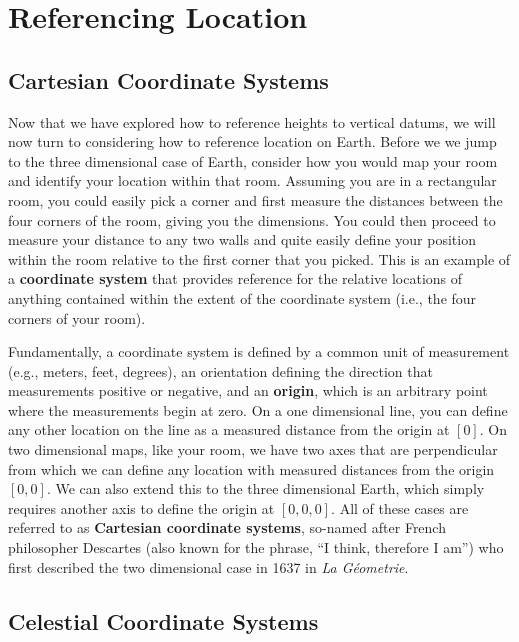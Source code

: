 \documentclass[
]{book}
\begin{document}
\hypertarget{referencing-location}{%
\section{Referencing Location}\label{referencing-location}}

\hypertarget{cartesian-coordinate-systems}{%
\subsection{Cartesian Coordinate Systems}\label{cartesian-coordinate-systems}}

Now that we have explored how to reference heights to vertical datums, we will now turn to considering how to reference location on Earth. Before we we jump to the three dimensional case of Earth, consider how you would map your room and identify your location within that room. Assuming you are in a rectangular room, you could easily pick a corner and first measure the distances between the four corners of the room, giving you the dimensions. You could then proceed to measure your distance to any two walls and quite easily define your position within the room relative to the first corner that you picked. This is an example of a \textbf{coordinate system} that provides reference for the relative locations of anything contained within the extent of the coordinate system (i.e., the four corners of your room).

Fundamentally, a coordinate system is defined by a common unit of measurement (e.g., meters, feet, degrees), an orientation defining the direction that measurements positive or negative, and an \textbf{origin}, which is an arbitrary point where the measurements begin at zero. On a one dimensional line, you can define any other location on the line as a measured distance from the origin at \([0]\). On two dimensional maps, like your room, we have two axes that are perpendicular from which we can define any location with measured distances from the origin \([0,0]\). We can also extend this to the three dimensional Earth, which simply requires another axis to define the origin at \([0,0,0]\). All of these cases are referred to as \textbf{Cartesian coordinate systems}, so-named after French philosopher Descartes (also known for the phrase, ``I think, therefore I am'') who first described the two dimensional case in 1637 in \emph{La Géometrie}.

\hypertarget{celestial-coordinate-systems}{%
\subsection{Celestial Coordinate Systems}\label{celestial-coordinate-systems}}
\end{document}
